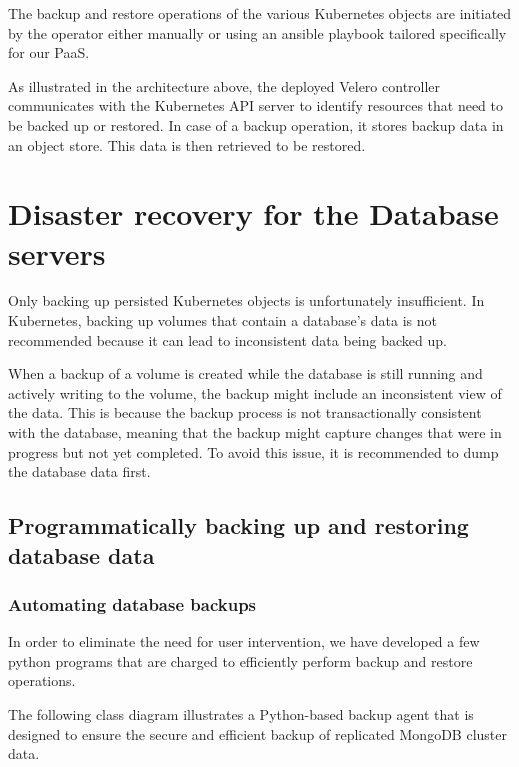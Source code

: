 \hspace{7mm}The backup and restore operations of the various Kubernetes objects are initiated by the operator either manually or using an ansible playbook tailored specifically for our PaaS. 

\hspace{7mm}As illustrated in the architecture above, the deployed Velero controller communicates with the Kubernetes API server to identify resources that need to be backed up or restored. In case of a backup operation, it stores backup data in an object store. This data is then retrieved to be restored. 

\section{Disaster recovery for the Database servers }

\hspace{7mm}Only backing up persisted Kubernetes objects is unfortunately insufficient. In Kubernetes, backing up volumes that contain a database's data is not recommended because it can lead to inconsistent data being backed up.

\hspace{7mm}When a backup of a volume is created while the database is still running and actively writing to the volume, the backup might include an inconsistent view of the data. This is because the backup process is not transactionally consistent with the database, meaning that the backup might capture changes that were in progress but not yet completed. To avoid this issue, it is recommended to dump the database data first. 

 \subsection{Programmatically backing up and restoring database data }
\subsubsection{Automating database backups}
\hspace{7mm}In order to eliminate the need for user intervention, we have developed a few python programs that are charged to efficiently perform backup and restore operations. 

\hspace{7mm}The following class diagram illustrates a Python-based backup agent that is designed to ensure the secure and efficient backup of replicated MongoDB cluster data.

